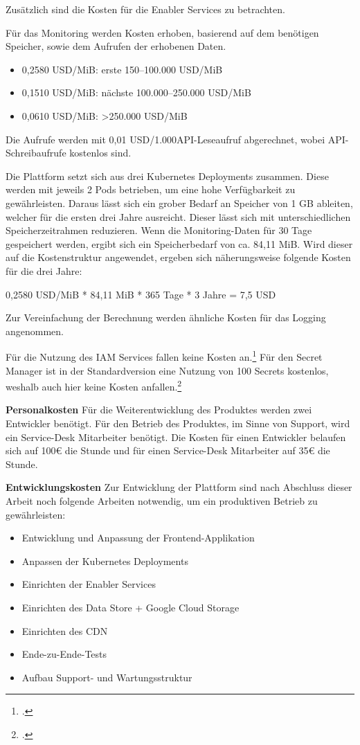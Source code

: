 Zusätzlich sind die Kosten für die Enabler Services zu betrachten.

Für das Monitoring werden Kosten erhoben, basierend auf dem benötigen Speicher, sowie dem Aufrufen der erhobenen Daten.

\begin{itemize}
    \item 0,2580 USD/MiB: erste 150–100.000 USD/MiB
    \item 0,1510 USD/MiB: nächste 100.000–250.000 USD/MiB
    \item 0,0610 USD/MiB: >250.000 USD/MiB
\end{itemize}

Die Aufrufe werden mit 0,01 USD/1.000API-Leseaufruf abgerechnet, wobei API-Schreibaufrufe kostenlos sind.

Die Plattform setzt sich aus drei Kubernetes Deployments zusammen.
Diese werden mit jeweils 2 Pods betrieben, um eine hohe Verfügbarkeit zu gewährleisten.
Daraus lässt sich ein grober Bedarf an Speicher von 1 GB ableiten, welcher für die ersten drei Jahre ausreicht.
Dieser lässt sich mit unterschiedlichen Speicherzeitrahmen reduzieren.
Wenn die Monitoring-Daten für 30 Tage gespeichert werden, ergibt sich ein Speicherbedarf von ca. 84,11 MiB.
Wird dieser auf die Kostenstruktur angewendet, ergeben sich näherungsweise folgende Kosten für die drei Jahre:

0,2580 USD/MiB * 84,11 MiB * 365 Tage * 3 Jahre = 7,5 USD

Zur Vereinfachung der Berechnung werden ähnliche Kosten für das Logging angenommen.

Für die Nutzung des \ac{IAM} Services fallen keine Kosten an.\footcite{GoogleIAMPricing2025}
Für den Secret Manager ist in der Standardversion eine Nutzung von 100 Secrets kostenlos, weshalb auch hier keine Kosten anfallen.\footcite{GoogleSecretManagerPricing2025}

\textbf{Personalkosten}\newline
Für die Weiterentwicklung des Produktes werden zwei Entwickler benötigt.
Für den Betrieb des Produktes, im Sinne von Support, wird ein Service-Desk Mitarbeiter benötigt.
Die Kosten für einen Entwickler belaufen sich auf 100€ die Stunde und für einen Service-Desk Mitarbeiter auf 35€ die Stunde.


\textbf{Entwicklungskosten}\newline
Zur Entwicklung der Plattform sind nach Abschluss dieser Arbeit noch folgende Arbeiten notwendig, um ein produktiven Betrieb zu gewährleisten:
\begin{itemize}
    \item Entwicklung und Anpassung der Frontend-Applikation
    \item Anpassen der Kubernetes Deployments
    \item Einrichten der Enabler Services
    \item Einrichten des Data Store + Google Cloud Storage
    \item Einrichten des CDN
    \item Ende-zu-Ende-Tests
    \item Aufbau Support- und Wartungsstruktur
\end{itemize}

